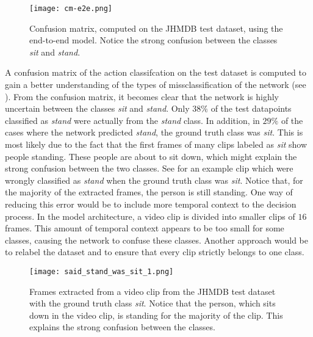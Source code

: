 \begin{figure}[htb!]
    \centering
    \texttt{[image: cm-e2e.png]}
    \caption{Confusion matrix, computed on the JHMDB test dataset, using the end-to-end model. Notice the strong confusion between the classes \textit{sit} and \textit{stand}.}
    \label{fig:cm-e2e}
\end{figure}

A confusion matrix of the action classifcation on the test dataset is computed to gain a better understanding of the types of missclassification of the network (see ).
From the confusion matrix, it becomes clear that the network is highly uncertain between the classes \textit{sit} and \textit{stand}.
Only $38\%$ of the test datapoints classified as \textit{stand} were actually from the \textit{stand} class.
In addition, in $29\%$ of the cases where the network predicted \textit{stand}, the ground truth class was \textit{sit}.
This is most likely due to the fact that the first frames of many clips labeled as \textit{sit} show people standing.
These people are about to sit down, which might explain the strong confusion between the two classes.
See  for an example clip which were wrongly classified as \textit{stand} when the ground truth class was \textit{sit}.
Notice that, for the majority of the extracted frames, the person is still standing.
One way of reducing this error would be to include more temporal context to the decision process.
In the model architecture, a video clip is divided into smaller clips of $16$ frames.
This amount of temporal context appears to be too small for some classes, causing the network to confuse these classes.
Another approach would be to relabel the dataset and to ensure that every clip strictly belongs to one class.

\begin{figure}[htb!]
    \centering
    \texttt{[image: said\_stand\_was\_sit\_1.png]}
    \caption{Frames extracted from a video clip from the JHMDB test dataset with the ground truth class \textit{sit}. Notice that the person, which sits down in the video clip, is standing for the majority of the clip. This explains the strong confusion between the classes.}
    \label{fig:e2e-confusion}
\end{figure}

